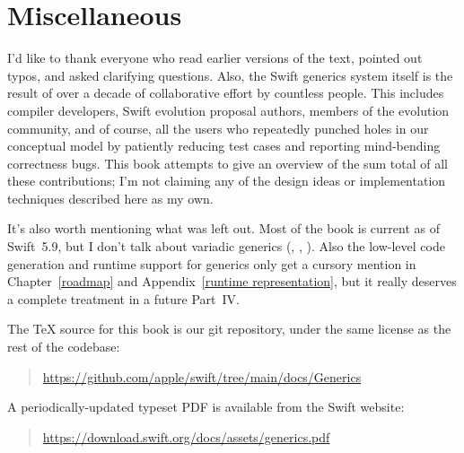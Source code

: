 \documentclass[../generics]{subfiles}
\begin{document}
\section*{Miscellaneous}

I'd like to thank everyone who read earlier versions of the text, pointed out typos, and asked clarifying questions. Also, the Swift generics system itself is the result of over a decade of collaborative effort by countless people. This includes compiler developers, Swift evolution proposal authors, members of the evolution community, and of course, all the users who repeatedly punched holes in our conceptual model by patiently reducing test cases and reporting mind-bending correctness bugs. This book attempts to give an overview of the sum total of all these contributions; I'm not claiming any of the design ideas or implementation techniques described here as my own.

It's also worth mentioning what was left out. Most of the book is current as of Swift~5.9, but I don't talk about variadic generics (\cite{se0393}, \cite{se0398}, \cite{se0399}). Also the low-level code generation and runtime support for generics only get a cursory mention in Chapter~\ref{roadmap} and Appendix~\ref{runtime representation}, but it really deserves a complete treatment in a future Part~IV.

The \TeX{} source for this book is our git repository, under the same license as the rest of the codebase:
\begin{quote}
\url{https://github.com/apple/swift/tree/main/docs/Generics}
\end{quote}
A periodically-updated typeset PDF is available from the Swift website:
\begin{quote}
\url{https://download.swift.org/docs/assets/generics.pdf}
\end{quote}
\end{document}
